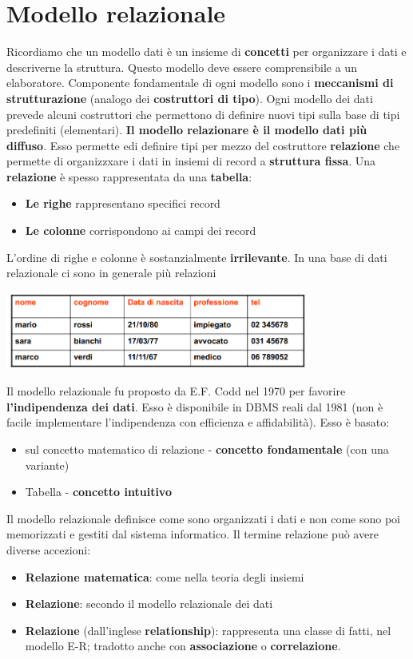 \documentclass[12pt]{article}
\begin{document}
\section{Modello relazionale}
Ricordiamo che un modello dati è un insieme di \textbf{concetti} per organizzare i dati e descriverne la struttura.
Questo modello deve essere comprensibile a un elaboratore.
Componente fondamentale di ogni modello sono i \textbf{meccanismi di strutturazione} (analogo dei \textbf{costruttori di tipo}).
Ogni modello dei dati prevede alcuni costruttori che permettono di definire nuovi tipi sulla base di tipi predefiniti (elementari).
\textbf{Il modello relazionare è il modello dati più diffuso}.
Esso permette edi definire tipi per mezzo del costruttore \textbf{relazione} che permette di organizzxare i dati in insiemi di record a \textbf{struttura fissa}.
Una \textbf{relazione} è spesso rappresentata da una \textbf{tabella}:
\begin{itemize}
    \item \textbf{Le righe} rappresentano specifici record
    \item \textbf{Le colonne} corrispondono ai campi dei record
\end{itemize}
L'ordine di righe e colonne è sostanzialmente \textbf{irrilevante}.
In una base di dati relazionale ci sono in generale più relazioni
\begin{center}
    \includegraphics[width = 0.75\textwidth]{Images/75.PNG}
\end{center}
Il modello relazionale fu proposto da E.F. Codd nel 1970 per favorire \textbf{l'indipendenza dei dati}.
Esso è disponibile in DBMS reali dal 1981 (non è facile implementare l'indipendenza con efficienza e affidabilità).
Esso è basato:
\begin{itemize}
    \item sul concetto matematico di relazione - \textbf{concetto fondamentale} (con una variante)
    \item Tabella - \textbf{concetto intuitivo}
\end{itemize}
Il modello relazionale definisce come sono organizzati i dati e non come sono poi memorizzati e gestiti dal sistema informatico.
Il termine relazione può avere diverse accezioni:
\begin{itemize}
    \item \textbf{Relazione matematica}: come nella teoria degli insiemi
    \item \textbf{Relazione}: secondo il modello relazionale dei dati
    \item \textbf{Relazione} (dall'inglese \textbf{relationship}): rappresenta una classe di fatti, nel modello E-R; tradotto anche con \textbf{associazione} o \textbf{correlazione}.
\end{itemize}
\end{document}
